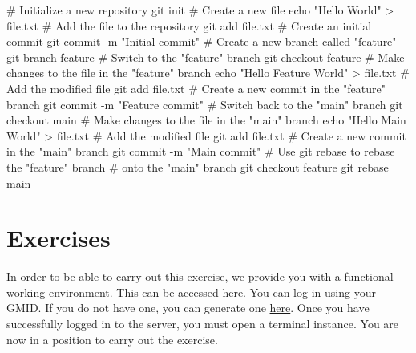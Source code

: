 \documentclass[
  letterpaper,
  DIV=11,
  numbers=noendperiod]{scrreprt}
\newenvironment{Shaded}{\begin{snugshade}}{\end{snugshade}}
\newcommand{\AttributeTok}[1]{\textcolor[rgb]{0.40,0.45,0.13}{#1}}
\newcommand{\BuiltInTok}[1]{\textcolor[rgb]{0.00,0.23,0.31}{#1}}
\newcommand{\CommentTok}[1]{\textcolor[rgb]{0.37,0.37,0.37}{#1}}
\newcommand{\FunctionTok}[1]{\textcolor[rgb]{0.28,0.35,0.67}{#1}}
\newcommand{\NormalTok}[1]{\textcolor[rgb]{0.00,0.23,0.31}{#1}}
\newcommand{\OperatorTok}[1]{\textcolor[rgb]{0.37,0.37,0.37}{#1}}
\newcommand{\StringTok}[1]{\textcolor[rgb]{0.13,0.47,0.30}{#1}}
\begin{document}
\begin{tcolorbox}
\begin{Shaded}
\begin{Highlighting}[]
\CommentTok{\# Initialize a new repository}
\FunctionTok{git}\NormalTok{ init}
\CommentTok{\# Create a new file}
\BuiltInTok{echo} \StringTok{"Hello World"} \OperatorTok{\textgreater{}}\NormalTok{ file.txt}
\CommentTok{\# Add the file to the repository}
\FunctionTok{git}\NormalTok{ add file.txt}
\CommentTok{\# Create an initial commit}
\FunctionTok{git}\NormalTok{ commit }\AttributeTok{{-}m} \StringTok{"Initial commit"}
\CommentTok{\# Create a new branch called "feature"}
\FunctionTok{git}\NormalTok{ branch feature}
\CommentTok{\# Switch to the "feature" branch}
\FunctionTok{git}\NormalTok{ checkout feature}
\CommentTok{\# Make changes to the file in the "feature" branch}
\BuiltInTok{echo} \StringTok{"Hello Feature World"} \OperatorTok{\textgreater{}}\NormalTok{ file.txt}
\CommentTok{\# Add the modified file}
\FunctionTok{git}\NormalTok{ add file.txt}
\CommentTok{\# Create a new commit in the "feature" branch}
\FunctionTok{git}\NormalTok{ commit }\AttributeTok{{-}m} \StringTok{"Feature commit"}
\CommentTok{\# Switch back to the "main" branch}
\FunctionTok{git}\NormalTok{ checkout main}
\CommentTok{\# Make changes to the file in the "main" branch}
\BuiltInTok{echo} \StringTok{"Hello Main World"} \OperatorTok{\textgreater{}}\NormalTok{ file.txt}
\CommentTok{\# Add the modified file}
\FunctionTok{git}\NormalTok{ add file.txt}
\CommentTok{\# Create a new commit in the "main" branch}
\FunctionTok{git}\NormalTok{ commit }\AttributeTok{{-}m} \StringTok{"Main commit"}
\CommentTok{\# Use git rebase to rebase the "feature" branch}
\CommentTok{\# onto the "main" branch}
\FunctionTok{git}\NormalTok{ checkout feature}
\FunctionTok{git}\NormalTok{ rebase main}
\end{Highlighting}
\end{Shaded}

\end{tcolorbox}

\section{Exercises}\label{exercises-9}

In order to be able to carry out this exercise, we provide you with a
functional working environment. This can be accessed
\href{https://hub.0x3e8.de/}{here}. You can log in using your GMID. If
you do not have one, you can generate one
\href{https://id.gm.fh-koeln.de/registrierung.php}{here}. Once you have
successfully logged in to the server, you must open a terminal instance.
You are now in a position to carry out the exercise.
\end{document}
